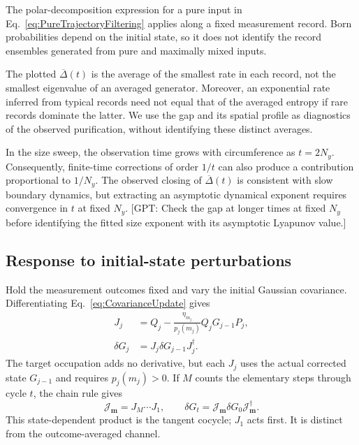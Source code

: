 \documentclass[aps,prb,10pt,twocolumn,superscriptaddress,longbibliography,floatfix]{revtex4-2}
\newcommand{\rec}{\mathbf m}   %
\newcommand{\GPT}[1]{{\color{magenta}[GPT: #1]}}
\begin{document}
{The polar-decomposition expression for a pure input in Eq.~\eqref{eq:PureTrajectoryFiltering} applies along a fixed measurement record. Born probabilities depend on the initial state, so it does not identify the record ensembles generated from pure and maximally mixed inputs.

The plotted $\overline{\Delta}(t)$ is the average of the smallest rate in each record, not the smallest eigenvalue of an averaged generator. Moreover, an exponential rate inferred from typical records need not equal that of the averaged entropy if rare records dominate the latter. We use the gap and its spatial profile as diagnostics of the observed purification, without identifying these distinct averages.

In the size sweep, the observation time grows with circumference as $t=2N_y$. Consequently, finite-time corrections of order $1/t$ can also produce a contribution proportional to $1/N_y$. The observed closing of $\overline{\Delta}(t)$ is consistent with slow boundary dynamics, but extracting an asymptotic dynamical exponent requires convergence in $t$ at fixed $N_y$.
\GPT{Check the gap at longer times at fixed $N_y$ before identifying the fitted size exponent with its asymptotic Lyapunov value.}

\subsection{Response to initial-state perturbations}
\label{app:TrajectoryResponse}

Hold the measurement outcomes fixed and vary the initial Gaussian covariance. Differentiating Eq.~\eqref{eq:CovarianceUpdate} gives
\begin{align}
 J_j&=Q_j-\frac{\eta_{m_j}}{p_j(m_j)}Q_jG_{j-1}P_j,\nonumber\\
 \delta G_j&=J_j\delta G_{j-1}J_j^\dagger.
 \label{eq:BranchCovarianceTangent}
\end{align}
The target occupation adds no derivative, but each $J_j$ uses the actual corrected state $G_{j-1}$ and requires $p_j(m_j)>0$. If $M$ counts the elementary steps through cycle $t$, the chain rule gives
\begin{equation}
 \mathcal J_{\rec}=J_M\cdots J_1,\qquad
 \delta G_t=\mathcal J_{\rec}\delta G_0\mathcal J_{\rec}^\dagger.
 \label{eq:CovarianceTangentProduct}
\end{equation}
This state-dependent product is the tangent cocycle; $J_1$ acts first. It is distinct from the outcome-averaged channel.

}
\end{document}
